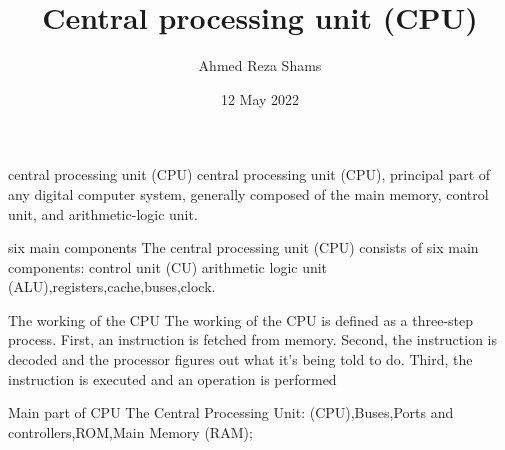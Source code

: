 \documentclass[12pt]{beamer}
\title{Central processing unit (CPU)}
\author{Ahmed Reza Shams}
\date{12 May 2022}
\begin{document}
\maketitle
\begin{frame}{central processing unit (CPU)}
central processing unit (CPU), principal part of any digital computer system, generally composed of the main memory, control unit, and arithmetic-logic unit.
\end{frame}
\begin{frame}{six main components}
The central processing unit (CPU) consists of six main components:
control unit (CU)
arithmetic logic unit (ALU),registers,cache,buses,clock.
\end{frame}
\begin{frame}{The working of the CPU}
 The working of the CPU is defined as a three-step process. First, an instruction is fetched from memory. Second, the instruction is decoded and the processor figures out what it's being told to do. Third, the instruction is executed and an operation is performed   
\end{frame}
\begin{frame}{Main part of CPU}
   The Central Processing Unit: (CPU),Buses,Ports and controllers,ROM,Main Memory (RAM);
\end{frame}
\end{document}
